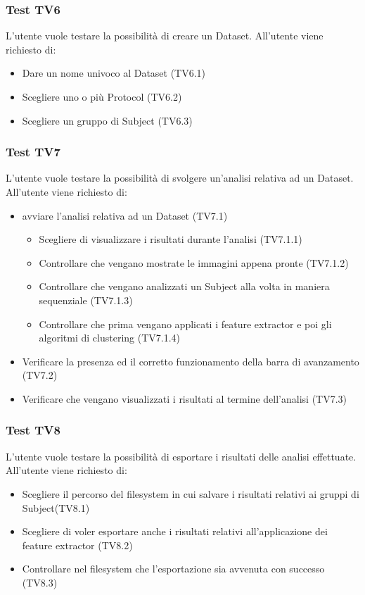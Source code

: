 \subsubsection{Test TV6}
\label{tv6}
L'utente vuole testare la possibilità di creare un Dataset.
All'utente viene richiesto di:
\begin{itemize}
\item Dare un nome univoco al Dataset (TV6.1)
\item Scegliere uno o più Protocol (TV6.2)
\item Scegliere un gruppo di Subject (TV6.3)
\end{itemize}

\subsubsection{Test TV7}
\label{tv7}
L'utente vuole testare la possibilità di svolgere un'analisi relativa ad un Dataset.
All'utente viene richiesto di:
\begin{itemize}
\item avviare l'analisi relativa ad un Dataset (TV7.1)
	\begin{itemize}
	\item Scegliere di visualizzare i risultati durante l'analisi (TV7.1.1)
	\item Controllare che vengano mostrate le immagini appena pronte (TV7.1.2)
	\item Controllare che vengano analizzati un Subject alla volta in maniera sequenziale (TV7.1.3)
	\item Controllare che prima vengano applicati i feature extractor e poi gli algoritmi di clustering (TV7.1.4)	
	\end{itemize}
	\item Verificare la presenza ed il corretto funzionamento della barra di avanzamento (TV7.2)
	\item Verificare che vengano visualizzati i risultati al termine dell'analisi (TV7.3)
\end{itemize}

\subsubsection{Test TV8}
\label{tv8}
L'utente vuole testare la possibilità di esportare i risultati delle analisi effettuate.
All'utente viene richiesto di:
\begin{itemize}
\item Scegliere il percorso del filesystem in cui salvare i risultati relativi ai gruppi di Subject(TV8.1)
\item Scegliere di voler esportare anche i risultati relativi all'applicazione dei feature extractor (TV8.2)
\item Controllare nel filesystem che l'esportazione sia avvenuta con successo (TV8.3)	
\end{itemize}

